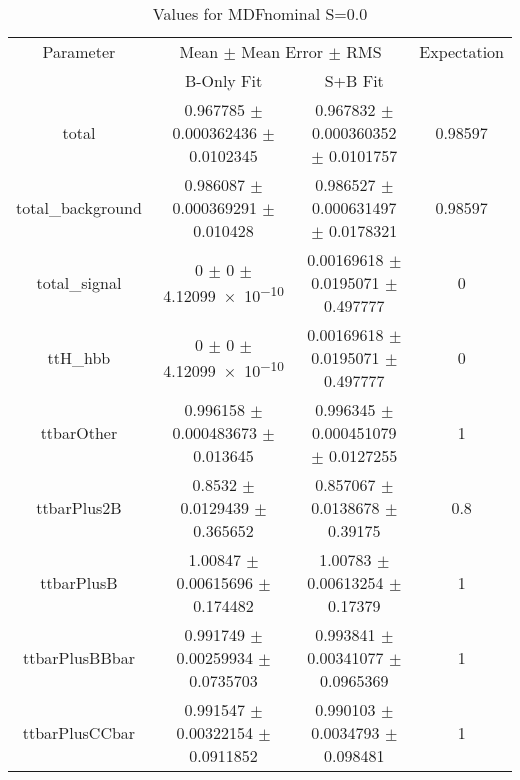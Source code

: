 \begin{table}
\centering
\caption{Values for MDFnominal S=0.0}
\begin{tabular}{cccc}
\toprule
Parameter & \multicolumn{2}{c}{Mean $\pm$ Mean Error $\pm$ RMS} & Expectation\\
 & B-Only Fit & S+B Fit & \\
\midrule
total & \num{0.967785} $\pm$ \num{0.000362436} $\pm$ \num{0.0102345} & \num{0.967832} $\pm$ \num{0.000360352} $\pm$ \num{0.0101757} & \num{0.98597}\\
total\_background & \num{0.986087} $\pm$ \num{0.000369291} $\pm$ \num{0.010428} & \num{0.986527} $\pm$ \num{0.000631497} $\pm$ \num{0.0178321} & \num{0.98597}\\
total\_signal & \num{0} $\pm$ \num{0} $\pm$ \num{4.12099e-10} & \num{0.00169618} $\pm$ \num{0.0195071} $\pm$ \num{0.497777} & \num{0}\\
ttH\_hbb & \num{0} $\pm$ \num{0} $\pm$ \num{4.12099e-10} & \num{0.00169618} $\pm$ \num{0.0195071} $\pm$ \num{0.497777} & \num{0}\\
ttbarOther & \num{0.996158} $\pm$ \num{0.000483673} $\pm$ \num{0.013645} & \num{0.996345} $\pm$ \num{0.000451079} $\pm$ \num{0.0127255} & \num{1}\\
ttbarPlus2B & \num{0.8532} $\pm$ \num{0.0129439} $\pm$ \num{0.365652} & \num{0.857067} $\pm$ \num{0.0138678} $\pm$ \num{0.39175} & \num{0.8}\\
ttbarPlusB & \num{1.00847} $\pm$ \num{0.00615696} $\pm$ \num{0.174482} & \num{1.00783} $\pm$ \num{0.00613254} $\pm$ \num{0.17379} & \num{1}\\
ttbarPlusBBbar & \num{0.991749} $\pm$ \num{0.00259934} $\pm$ \num{0.0735703} & \num{0.993841} $\pm$ \num{0.00341077} $\pm$ \num{0.0965369} & \num{1}\\
ttbarPlusCCbar & \num{0.991547} $\pm$ \num{0.00322154} $\pm$ \num{0.0911852} & \num{0.990103} $\pm$ \num{0.0034793} $\pm$ \num{0.098481} & \num{1}\\
\bottomrule
\end{tabular}
\end{table}